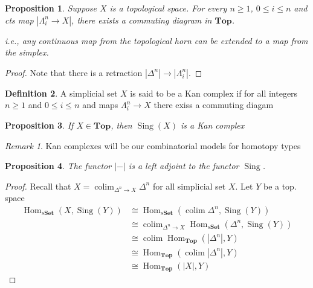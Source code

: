 \documentclass{article}
\theoremstyle{definition}
\newtheorem{defn}{Definition}[section]
\theoremstyle{remark}
\newtheorem{rem}{Remark}
\theoremstyle{plain}
\newtheorem{prop}[defn]{Proposition}
\newcommand{\Hom}{\operatorname{Hom}}
\newcommand{\btop}{\mathbf{Top}}
\newcommand{\sing}{\operatorname{Sing}}
\newcommand{\bset}{\mathbf{Set}}
\begin{document}
\begin{prop}
    Suppose $X$ is a topological space. For every $n\ge 1$, $0\le i\le n$ and cts map $|\Lambda_i^n\to X|$, there exists a commuting diagram in $\btop$.
    \begin{center}
    \end{center}
    i.e., any continuous map from the topological horn can be extended to a map from the simplex.
\end{prop}
\begin{proof}
    Note that there is a retraction $|\Delta^n|\to|\Lambda_i^n|$.
\end{proof}
\begin{defn}
    A simplicial set $X$ is said to be a Kan complex if for all integers $n\ge 1$ and $0\le i\le n$ and maps $\Lambda_i^n\to X$ there exiss a commuting diagam
    \begin{center}
    \end{center}
\end{defn}

\begin{prop}
    If $X\in\btop$, then $\sing(X)$ is a Kan complex
\end{prop}
\begin{rem}
    Kan complexes will be our combinatorial models for homotopy types
\end{rem}
\begin{prop}
    The functor $|-|$ is a left adjoint to the functor $\sing$.
\end{prop}
\begin{proof}
    Recall that $X=\operatorname{colim}_{\Delta^n\to X}\Delta^n$ for all simplicial set $X$. Let $Y$ be a top. space
    \begin{align*}
        \Hom_{s\bset}(X,\sing(Y))&\cong\Hom_{s\bset}(\operatorname{colim}\Delta^n,\sing(Y))\\
        &\cong\operatorname{colim}_{\Delta^n\to X}\Hom_{s\bset}(\Delta^n,\sing(Y))\\
        &\cong\operatorname{colim}\Hom_\btop(|\Delta^n|,Y)\\
        &\cong\Hom_\btop(\operatorname{colim}|\Delta^n|,Y)\\
        &\cong\Hom_\btop(|X|,Y)
    \end{align*}
\end{proof}
\end{document}
